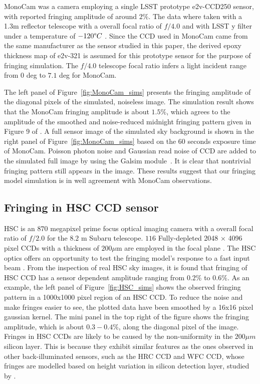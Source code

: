 \documentclass[twocolumn]{aastex63} %
\begin{document}
\begin{CJK*}{UTF8}{gbsn}
MonoCam was a camera employing a single LSST prototype e2v-CCD250 sensor, with reported fringing amplitude of around $2\%$. The data where taken with a 1.3m reflector telescope with a overall focal ratio of $f/4.0$ and with LSST y filter under a temperature of $-120\degree C$ \citep{Brooks17}. Since the CCD used in MonoCam came from the same manufacturer as the sensor studied in this paper, the derived epoxy thickness map of e2v-321 is assumed for this prototype sensor for the purpose of fringing simulation. The $f/4.0$ telescope focal ratio infers a light incident range from $0$ deg to $7.1$ deg for MonoCam.

The left panel of Figure~\ref{fig:MonoCam_sims} presents the fringing amplitude of the diagonal pixels of the simulated, noiseless image. The simulation result shows that the MonoCam fringing amplitude is about $1.5\%$, which agrees to the amplitude of the smoothed and noise-reduced midnight fringing pattern given in Figure 9 of \citet{Brooks17}. A full sensor image of the simulated sky background is shown in the right panel of Figure~\ref{fig:MonoCam_sims} based on the $60$ seconds exposure time \citep{Brooks17} of MonoCam. Poisson photon noise and Gaussian read noise of CCD are added to the simulated full image by using the Galsim module~\citep{Galsim}. It is clear that nontrivial fringing pattern still appears in the image. These results suggest that our fringing model simulation is in well agreement with MonoCam observations.

\subsection{Fringing in HSC CCD sensor}

HSC is an $870$ megapixel prime focus optical imaging camera with a overall focal ratio of $f/2.0$ for the $8.2$ m Subaru telescope. $116$ Fully-depleted  2048 × 4096 pixel CCDs with a thickness of $200\mu$m are employed in the focal plane \citep{Miyazaki18}. The HSC optics offers an opportunity to test the fringing model's response to a fast input beam . From the inspection of real HSC sky images, it is found that fringing of HSC CCD has a sensor dependent amplitude ranging from $0.2\%$ to $0.6\%$. As an example, the left panel of Figure~\ref{fig:HSC_sims} shows the observed fringing pattern in a 1000x1000 pixel region of an HSC CCD. To reduce the noise and make fringes easier to see, the plotted data have been smoothed by a 16x16 pixel gaussian kernel. The mini panel in the top right of the figure shows the fringing amplitude, which is about $0.3-0.4\%$, along the diagonal pixel of the image. Fringes in HSC CCDs are likely to be caused by the non-uniformity in the $200\mu m$ silicon layer. This is because they exhibit similar features as the ones observed in other back-illuminated sensors, such as the HRC CCD and WFC CCD, whose fringes are modelled based on height variation in silicon detection layer, studied by \citet{Walsh03}. 


\end{CJK*}
\end{document}

